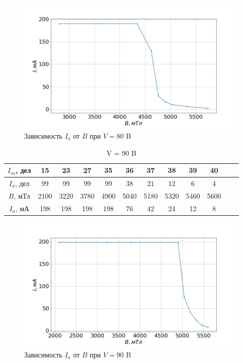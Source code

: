 \documentclass[a4paper, fontsize=14pt]{article}
\begin{document}
\begin{figure}[H]
\center
\includegraphics[scale=0.4]{2.png}
\caption{Зависимость $I_a$ от $B$ при $V = 80$ B}
\end{figure}

\begin{table}[H]

	\centering
	\begin{tabular}{|c|c|c|c|c|c|c|c|c|c|c|c|}
     \hline
     $I_m$, дел & 15&	23&	27&	35&	36&	37&	38&	39&	40
\\ \hline
     $I_a$, дел &	99&	99&	99&	99&	38&	21&	12&	6&	4
 \\ \hline
     $B$, мТл& 2100&	3220&	3780&	4900&	5040&	5180&	5320&	5460&	5600
\\ \hline
$I_a$, мА & 198&	198&	198&	198&	76&	42&	24&	12&	8
\\ \hline

\end{tabular}
	\caption{V = 90 B}
\end{table}

\begin{figure}[H]
\center
\includegraphics[scale=0.4]{3.png}
\caption{Зависимость $I_a$ от $B$ при $V = 90$ B}
\end{figure}
\end{document}
